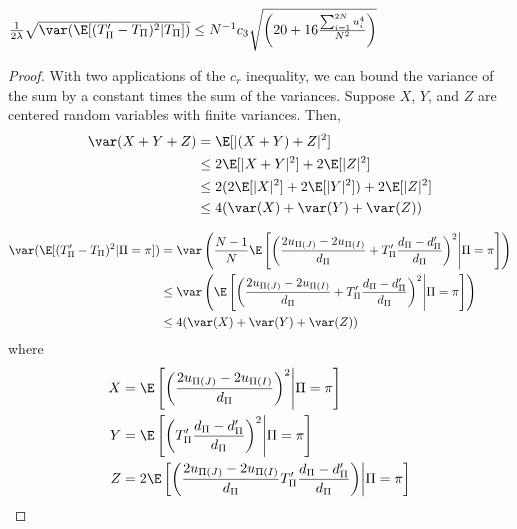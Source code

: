 \begin{proposition}
$\frac{1}{2\lambda} \sqrt{\var (\E [(T_{\Pi}'-T_{\Pi})^2|T_{\Pi}])} \leq N^{-1} c_3\sqrt{\left (20 +
    16\frac{\sum_{i=1}^{2N} u_{i}^4}{N^2} \right )}$
\end{proposition}
\begin{proof}
  With two applications of the $c_r$ inequality, we can bound the
  variance of the sum by a constant times the sum of the variances.  
  Suppose $X$, $Y$, and $Z$ are centered random variables with finite
  variances.  Then, 
  \begin{align*}
    \var(X+Y+Z) &= \E[|(X+Y)+Z|^2] \\
    &\leq 2 \E[|X+Y|^2] + 2\E[|Z|^2] \\
    &\leq 2(2\E[|X|^2] + 2\E[|Y|^2]) + 2\E[|Z|^2] \\
    &\leq 4(\var(X) + \var(Y) + \var(Z))
  \end{align*}

  \begin{align*}
    \var (\E[(T_{\Pi}'-T_{\Pi})^2 | \Pi = \pi]) &= \var \left ( \frac{N-1}{N}\E \left [
      \left ( \frac{2u_{\Pi(J)}-2u_{\Pi(I)}}{d_{\Pi}}+T_{\Pi}'\frac{d_{\Pi}-d_{\Pi}'}{d_{\Pi}} \right )^2
        \middle | \Pi = \pi \right ] \right ) \\
    &\leq \var \left ( \E \left [
      \left ( \frac{2u_{\Pi(J)}-2u_{\Pi(I)}}{d_{\Pi}}+T_{\Pi}'\frac{d_{\Pi}-d_{\Pi}'}{d_{\Pi}} \right )^2
        \middle | \Pi = \pi \right ] \right ) \\
    &\leq 4(\var(X) + \var(Y) + \var(Z))
  \end{align*}
  where
  \begin{align*}
    X &= \E \left [ \left ( \frac{2u_{\Pi(J)}-2u_{\Pi(I)}}{d_{\Pi}} \right )^2
        \middle | \Pi = \pi \right ] \\
    Y &= \E \left [ \left
          ( T_{\Pi}'\frac{d_{\Pi}-d_{\Pi}'}{d_{\Pi}} \right )^2 \middle | \Pi = \pi \right ] \\
    Z &= 2 \E \left [ \left ( \frac{2u_{\Pi(J)}-2u_{\Pi(I)}}{d_{\Pi}}
         T_{\Pi}'\frac{d_{\Pi}-d_{\Pi}'}{d_{\Pi}} \right ) \middle | \Pi = \pi \right ]
  \end{align*}


\end{proof}
